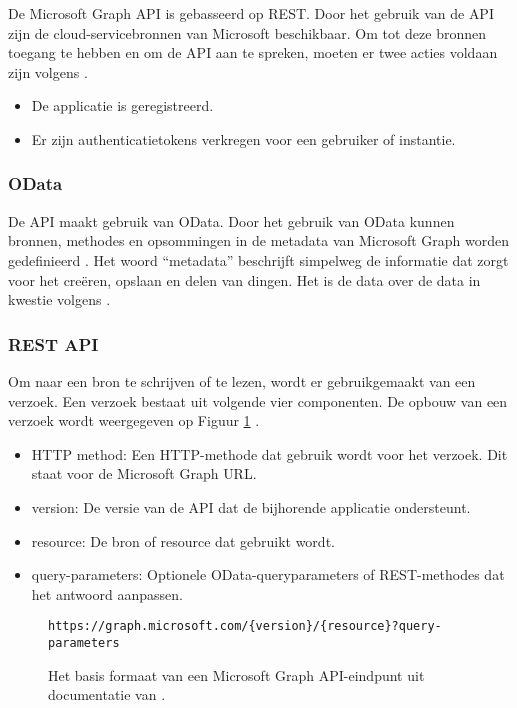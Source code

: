 De Microsoft Graph \Ac{API} is gebasseerd op \Ac{REST}. Door het gebruik van de \ac{API} zijn de cloud-servicebronnen van Microsoft beschikbaar. Om tot deze bronnen toegang te hebben en om de \Ac{API} aan te spreken, moeten er twee acties voldaan zijn volgens \textcite{Microsoft2023vv}.

\begin{itemize}
    \item De applicatie is geregistreerd.
    \item Er zijn authenticatietokens verkregen voor een gebruiker of instantie.
\end{itemize}

\subsubsection{OData}

De \ac{API} maakt gebruik van OData. Door het gebruik van OData kunnen bronnen, methodes en opsommingen in de metadata van Microsoft Graph worden gedefinieerd \autocite{Microsoft2023vv}. Het woord “metadata” beschrijft simpelweg de informatie dat zorgt voor het creëren, opslaan en delen van dingen. Het is de data over de data in kwestie volgens \textcite{Riley2017}.

\subsubsection{REST API}

Om naar een bron te schrijven of te lezen, wordt er gebruikgemaakt van een verzoek. Een verzoek bestaat uit volgende vier componenten. De opbouw van een verzoek wordt weergegeven op Figuur \ref{RAM} \autocite{Microsoft2023vv}.

\begin{itemize}
    \item \ac{HTTP} method: Een \ac{HTTP}-methode dat gebruik wordt voor het verzoek. Dit staat voor de Microsoft Graph \ac{URL}.
    \item version: De versie van de \ac{API} dat de bijhorende applicatie ondersteunt.
    \item resource: De bron of resource dat gebruikt wordt.
    \item query-parameters: Optionele OData-queryparameters of \Ac{REST}-methodes dat het antwoord aanpassen.
\end{itemize}

\begin{figure}[h!]
    \scriptsize
    \begin{verbatim}
https://graph.microsoft.com/{version}/{resource}?query-parameters
    \end{verbatim}    
    \caption[Basis formaat Microsoft Graph API-eindpunt]{Het basis formaat van een Microsoft Graph \Ac{API}-eindpunt uit documentatie van \textcite{Microsoft2023o}.}
    \label{RAM}
\end{figure}



